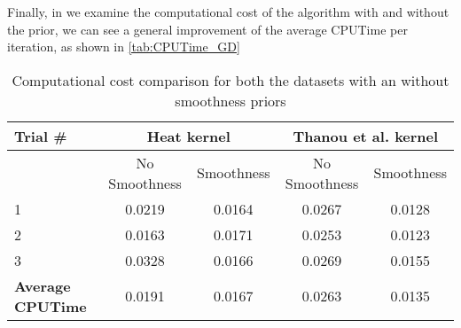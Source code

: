 Finally, in we examine the computational cost of the algorithm with and without the prior, we can see a general improvement of the average CPUTime per iteration, as shown in \autoref{tab:CPUTime_GD}

\begin{table}[htbp]
  \centering
  \begin{tabular}{lcccc}
  \textbf{Trial \#} &\multicolumn{2}{c}{\textbf{Heat kernel}}&\multicolumn{2}{c}{\textbf{Thanou et al. kernel}}\\
  \toprule
  & No Smoothness & Smoothness & No Smoothness & Smoothness\\ %
  \midrule
    1 & 0.0219 & 0.0164 & 0.0267 & 0.0128\\
    2 & 0.0163 & 0.0171 & 0.0253 & 0.0123\\
    3 & 0.0328 & 0.0166 & 0.0269 & 0.0155\\
    \textbf{Average CPUTime} & 0.0191 & 0.0167 & 0.0263 & 0.0135 \\
    \bottomrule
  \end{tabular}
  \caption{Computational cost comparison for both the datasets with an without smoothness priors}
  \label{tab:CPUTime_GD}
\end{table}
